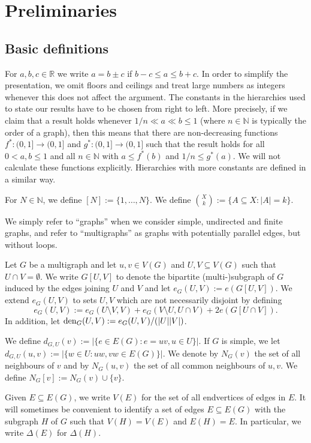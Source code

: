 \documentclass[a4paper, 11pt, reqno]{amsart}
\numberwithin{equation}{section}
\newcommand{\1}{{\rm 1\hspace*{-0.4ex}%
\rule{0.1ex}{1.52ex}\hspace*{0.2ex}}}
\newcommand{\N}{\mathbb N}
\newcommand{\es}{\emptyset}
\newcommand{\den}{{\rm den}}
\newcommand{\sub}{\subseteq}
\newcommand{\COMMENT}[1]{}
\begin{document}
\section{Preliminaries}
\label{sec: preliminaries}

\subsection{Basic definitions}

For $a,b,c\in \mathbb{R}$ we write $a = b\pm c$ if $b-c \leq a \leq b+c$. In order to simplify the presentation, we omit floors and ceilings and treat large numbers as integers whenever this does not affect the argument. The constants in the hierarchies used to state our results have to be chosen from right to left. More precisely, if we claim that a result holds whenever $1/n \ll a \ll b \leq 1$ (where $n\in \N$ is typically the order of a graph), then this means that there are non-decreasing
functions $f^* : (0, 1] \rightarrow (0, 1]$ and $g^* : (0, 1] \rightarrow (0, 1]$ such that the result holds for all $0 < a, b \leq 1 $ and all $n \in \mathbb{N}$ with $a \leq f^*(b)$ and $1/n \leq g^*(a)$. We will not calculate these functions explicitly. Hierarchies with more constants are
defined in a similar way.

For $N\in \N$, we define $[N]:=\{1,\dots, N\}$.
We define $\binom{X}{k}:=\{A\subseteq X: |A|=k\}$.

We simply refer to ``graphs'' when we consider simple, undirected and finite graphs,
and refer to ``multigraphs'' as graphs with potentially parallel edges, but without loops.

Let $G$ be a multigraph
and let $u,v \in V(G)$ and $U,V\sub V(G)$ such that $U\cap V=\es$.
We write $G[U,V]$ to denote the bipartite (multi-)subgraph of $G$ induced by the edges joining $U$ and $V$
and let $e_G(U,V):=e(G[U,V])$.
We extend $e_G(U,V)$ to sets $U,V$ which are not necessarily disjoint by
defining $$e_G(U,V) := e_{G}(U\setminus V, V) + e_{G}( V\setminus U, U\cap V) + 2e(G[U\cap V]).$$
In addition, let $\den_G(U,V):= e_G(U,V)/(|U||V|)$.

We define $d_{G,U}(v):=|\{e \in E(G): e=uv, u\in U\}|$. 
If $G$ is simple, we let $d_{G,U}(u,v):=|\{w \in U:  uw , vw\in E(G)\}|$.
We denote by $N_G(v)$ the set of all neighbours of $v$
and by $N_G(u,v)$ the set of all common neighbours of $u,v$.
We define $N_G[v]:=N_G(v)\cup \{v\}$.

Given $E\sub E(G)$, we write $V(E)$ for the set of all endvertices of edges in $E$.
It will sometimes be convenient to identify a set of edges $E\sub E(G)$ with the subgraph $H$ of $G$
such that $V(H)=V(E)$ and $E(H)=E$.
In particular, we write $\Delta(E)$ for $\Delta(H)$.
\end{document}
